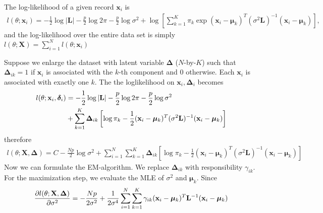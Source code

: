 \begin{exercise}
  \begin{exerciseSection}
    The log-likelihood of a given record $\mathbf{x}_i$ is
    \begin{align}
      l(\theta;\mathbf{x}_i) =
      -\frac{1}{2}\log|\mathbf{L}| - \frac{p}{2}\log2\pi - 
      \frac{p}{2}\log\sigma^2 + \log\left[\sum_{k=1}^K\pi_k\exp(\mathbf{x}_i -
      \bm{\mu}_k)^T(\sigma^2\mathbf{L})^{-1} (\mathbf{x}_i -
      \bm{\mu}_k)\right],
    \end{align}
    and the log-likelihood over the entire data set is simply
    $l(\theta;\mathbf{X}) = \sum_{i=1}^Nl(\theta;\mathbf{x}_i)$
  \end{exerciseSection}
  
  \begin{exerciseSection}
    Suppose we enlarge the dataset with latent variable $\mathbf{\Delta}$
    ($N$-by-$K$) such that $\mathbf{\Delta}_{ik} = 1$ if $\mathbf{x}_i$ is
    associated with the $k$-th component and 0 otherwise. Each $\mathbf{x}_i$ is
    associated with exactly one $k$. The the loglikelihood on $\mathbf{x}_i,
    \mathbf{\Delta}_i$ becomes
    \begin{align}
      l(\theta;\mathbf{x}_i, \bm{\delta}_i) & = -\frac{1}{2}\log|\mathbf{L}| -
      \frac{p}{2}\log2\pi - \frac{p}{2}\log\sigma^2 \notag \\
      & + \sum_{k=1}^K
      \mathbf{\Delta}_{ik}\left[\log\pi_k - \frac{1}{2}(\mathbf{x}_i -
      \bm{\mu}_k)^T(\sigma^2\mathbf{L})^{-1} (\mathbf{x}_i -
      \bm{\mu}_k)\right]
    \end{align}
    therefore
    \begin{align}
      l(\theta;\mathbf{X}, \mathbf{\Delta}) = C - \frac{Np}{2}\log\sigma^2 +
      \sum_{i=1}^N\sum_{k=1}^K\mathbf{\Delta}_{ik}\left[\log\pi_k -
      \frac{1}{2}(\mathbf{x}_i - \bm{\mu}_k)^T(\sigma^2\mathbf{L})^{-1}
      (\mathbf{x}_i - \bm{\mu}_k)\right]
    \end{align}
    Now we can formulate the EM-algorithm. We replace $\mathbf{\Delta}_{ik}$
    with responsibility $\gamma_{ik}$. For the maximization step, we evaluate
    the MLE of $\sigma^2$ and $\mathbf{\mu}_k$. Since
    \begin{align}
      \pdv{l(\theta;\mathbf{X}, \mathbf{\Delta})}{\sigma^2} & = -
      \frac{Np}{2\sigma^2} +
      \frac{1}{2\sigma^4}\sum_{i=1}^N\sum_{k=1}^K \gamma_{ik}
      (\mathbf{x}_i - \bm{\mu}_k)^T \mathbf{L}^{-1} (\mathbf{x}_i -
      \bm{\mu}_k) \\

\end{align}
\end{exerciseSection}
\end{exercise}
